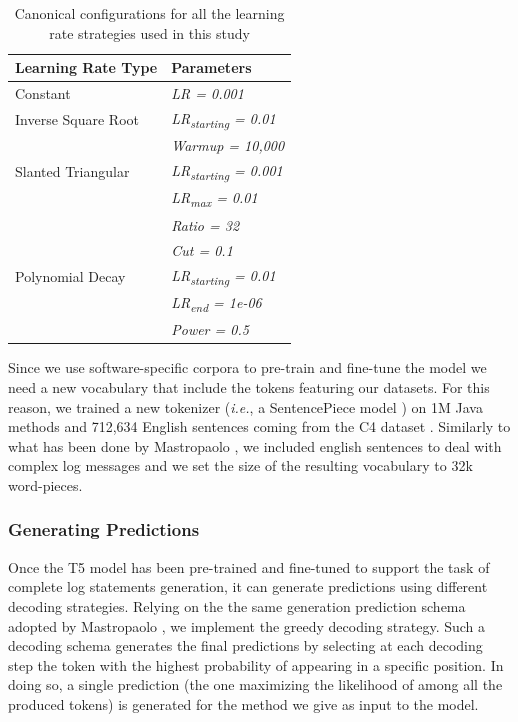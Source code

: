 \begin{table}[h]
	\centering
	\begin{tabular}{ll}
		\hline
		\textbf{Learning Rate Type} & \textbf{Parameters}               \\ \hline
		Constant                     & \textit{LR = 0.001}               \\
		Inverse Square Root         & \textit{LR\textsubscript{starting} = 0.01}  \\
		& \textit{Warmup = 10,000}          \\
		Slanted Triangular          & \textit{LR\textsubscript{starting} = 0.001} \\
		& \textit{LR\textsubscript{max} = 0.01}       \\
		& \textit{Ratio = 32}               \\
		& \textit{Cut = 0.1}                \\
		Polynomial Decay            & \textit{LR\textsubscript{starting} = 0.01}  \\
		& \textit{LR\textsubscript{end} = 1e-06}      \\
		& \textit{Power = 0.5}              \\ \hline
	\end{tabular}
	\vspace{0.2cm}
	\caption{Canonical configurations for all the learning rate strategies used in this study}
	\label{tab:learning-rates}
\end{table}

Since we use software-specific corpora to pre-train and fine-tune the model we need a new vocabulary that include the \java tokens featuring our datasets. For this reason, we trained a new tokenizer (\emph{i.e.}, a SentencePiece model \cite{kudo2018sentencepiece}) on 1M Java methods and 712,634 English sentences coming from the C4 dataset \cite{raffel2019exploring}. Similarly to what has been done by Mastropaolo \etal \cite{mastropaolo2022using}, we included english sentences to deal with complex log messages and we set the size of the resulting vocabulary to 32k word-pieces.


\subsubsection{Generating Predictions}
Once the T5 model has been pre-trained and fine-tuned to support the task of complete log statements generation, it can generate predictions using different decoding strategies. Relying on the the same generation prediction schema adopted by Mastropaolo \etal \cite{mastropaolo2022using}, we implement the greedy decoding strategy. Such a decoding schema generates the final predictions by selecting at each decoding step the token with the highest probability of appearing in a specific position. In doing so, a single prediction (\ie the one maximizing the likelihood of among all the produced tokens) is generated for the method we give as input to the model.




